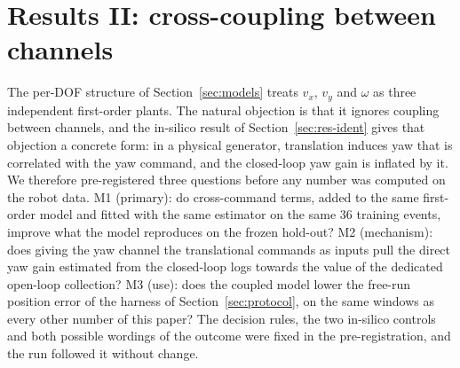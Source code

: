\section{Results II: cross-coupling between channels}
\label{sec:res-coupling}



The per-DOF structure of Section~\ref{sec:models} treats $v_x$, $v_y$ and $\omega$ as three independent first-order plants. The natural objection is that it ignores coupling between channels, and the in-silico result of Section~\ref{sec:res-ident} gives that objection a concrete form: in a physical generator, translation induces yaw that is correlated with the yaw command, and the closed-loop yaw gain is inflated by it. We therefore pre-registered three questions before any number was computed on the robot data. M1 (primary): do cross-command terms, added to the same first-order model and fitted with the same estimator on the same 36 training events, improve what the model reproduces on the frozen hold-out? M2 (mechanism): does giving the yaw channel the translational commands as inputs pull the direct yaw gain estimated from the closed-loop logs towards the value of the dedicated open-loop collection? M3 (use): does the coupled model lower the free-run position error of the harness of Section~\ref{sec:protocol}, on the same windows as every other number of this paper? The decision rules, the two in-silico controls and both possible wordings of the outcome were fixed in the pre-registration, and the run followed it without change.

